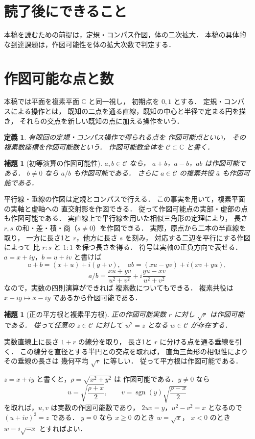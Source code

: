 \documentclass[a5paper,10pt,onecolumn]{jsarticle}
\makeatletter
\theoremstyle{mathnotetheorem}
\newtheorem{definition}[theorem]{定義}
\newtheorem{lemma}[theorem]{補題}
\renewcommand{\proofname}{証明}
\renewenvironment{proof}[1][\proofname]{%
  \par\pushQED{\qed}\normalfont\topsep4\p@\@plus2\p@\relax
  \trivlist\item[\hskip\labelsep\bfseries #1]\ignorespaces
}{\popQED\endtrivlist\@endpefalse}
\makeatother
\begin{document}
\section*{読了後にできること}
本稿を読むための前提は，定規・コンパス作図，体の二次拡大．
本稿の具体的な到達課題は，作図可能性を体の拡大次数で判定する．

\section{作図可能な点と数}

本稿では平面を複素平面 $\mathbb C$ と同一視し，
初期点を $0,1$ とする．
定規・コンパスによる操作とは，
既知の二点を通る直線，既知の中心と半径で定まる円を描き，
それらの交点を新しい既知の点に加える操作をいう．

\begin{definition}
有限回の定規・コンパス操作で得られる点を
\emph{作図可能点}といい，
その複素数座標を作図可能数という．
作図可能数全体を $\mathcal C\subset\mathbb C$ と書く．
\end{definition}

\begin{lemma}[初等演算の作図可能性]\label{lem:arithmetic}
$a,b\in\mathcal C$ なら，
$a+b$，$a-b$，$ab$ は作図可能である．
$b\ne0$ なら $a/b$ も作図可能である．
さらに $a\in\mathcal C$ の複素共役 $\overline a$ も作図可能である．
\end{lemma}
\begin{proof}
平行線・垂線の作図は定規とコンパスで行える．
この事実を用いて，複素平面の実軸と虚軸への
直交射影を作図できる．
従って作図可能点の実部・虚部の点も作図可能である．
実直線上で平行線を用いた相似三角形の定理により，
長さ $r,s$ の和・差・積・商（$s\ne0$）を作図できる．
実際，原点から二本の半直線を取り，
一方に長さ1と $r$，他方に長さ $s$ を刻み，
対応する二辺を平行にする作図によって
比 $r:s$ と $1:1$ を保つ長さを得る．
符号は実軸の正負方向で表せる．
$a=x+iy$，$b=u+iv$ と書けば
\[
 a+b=(x+u)+i(y+v),\quad
 ab=(xu-yv)+i(xv+yu),
\]
\[
 a/b=\frac{xu+yv}{u^2+v^2}
 +i\frac{yu-xv}{u^2+v^2}
\]
なので，実数の四則演算ができれば
複素数についてもできる．
複素共役は $x+iy\mapsto x-iy$ であるから作図可能である．
\end{proof}

\begin{lemma}[正の平方根と複素平方根]\label{lem:sqrt}
正の作図可能実数 $r$ に対し $\sqrt r$ は作図可能である．
従って任意の $z\in\mathcal C$ に対して
$w^2=z$ となる $w\in\mathcal C$ が存在する．
\end{lemma}
\begin{proof}
実数直線上に長さ $1+r$ の線分を取り，
長さ1と $r$ に分ける点を通る垂線を引く．
この線分を直径とする半円との交点を取れば，
直角三角形の相似性によりその垂線の長さは
幾何平均 $\sqrt r$ に等しい．
従って平方根は作図可能である．

$z=x+iy$ と書くと，$\rho=\sqrt{x^2+y^2}$ は
作図可能である．$y\ne0$ なら
\[
 u=\sqrt{\frac{\rho+x}{2}},\qquad
 v=\operatorname{sgn}(y)\sqrt{\frac{\rho-x}{2}}
\]
を取れば，$u,v$ は実数の作図可能数であり，
$2uv=y$，$u^2-v^2=x$ となるので
$(u+iv)^2=z$ である．
$y=0$ なら $x\ge0$ のとき $w=\sqrt x$，
$x<0$ のとき $w=i\sqrt{-x}$ とすればよい．
\end{proof}
\end{document}
